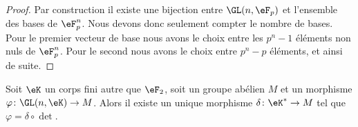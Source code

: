 \begin{proof}
    Par construction il existe une bijection entre \( \GL(n,\eF_p)\) et l'ensemble des bases de \( \eF_p^n\). Nous devons donc seulement compter le nombre de bases. Pour le premier vecteur de base nous avons le choix entre les \( p^n-1\) éléments non nuls de \( \eF_p^n\). Pour le second nous avons le choix entre \( p^n-p\) éléments, et ainsi de suite.
\end{proof}

\begin{lemma}   \label{LemcDOTzM}
    Soit \( \eK\) un corps fini autre que \( \eF_2\), soit un groupe abélien \( M\) et un morphisme \( \varphi\colon \GL(n,\eK)\to M\). Alors il existe un unique morphisme \( \delta\colon \eK^*\to M\) tel que \( \varphi=\delta\circ\det\).
\end{lemma}


